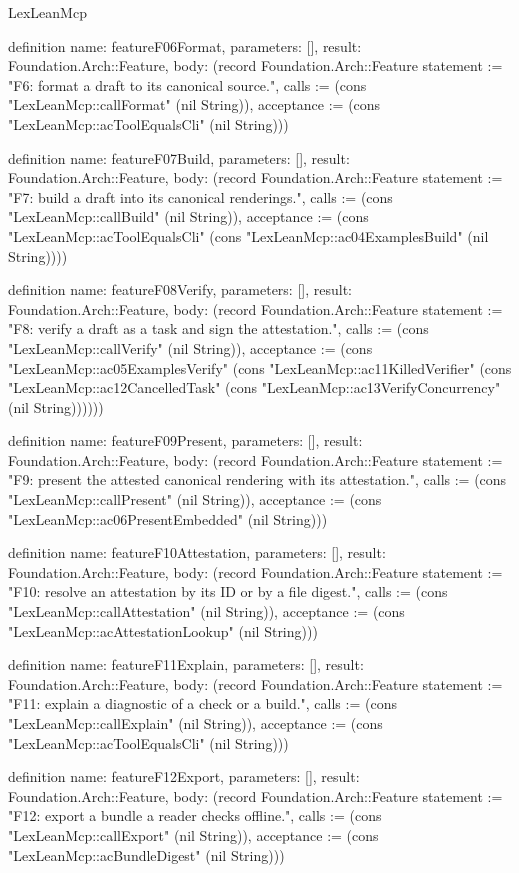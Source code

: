 \begin{lexlean}{LexLeanMcp}
\begin{semanticmodule}
definition{
  name: featureF06Format,
  parameters: [],
  result: Foundation.Arch::Feature,
  body: (record Foundation.Arch::Feature {statement := "F6: format a draft to its canonical source.", calls := (cons "LexLeanMcp::callFormat" (nil String)), acceptance := (cons "LexLeanMcp::acToolEqualsCli" (nil String))})
}

definition{
  name: featureF07Build,
  parameters: [],
  result: Foundation.Arch::Feature,
  body: (record Foundation.Arch::Feature {statement := "F7: build a draft into its canonical renderings.", calls := (cons "LexLeanMcp::callBuild" (nil String)), acceptance := (cons "LexLeanMcp::acToolEqualsCli" (cons "LexLeanMcp::ac04ExamplesBuild" (nil String)))})
}

definition{
  name: featureF08Verify,
  parameters: [],
  result: Foundation.Arch::Feature,
  body: (record Foundation.Arch::Feature {statement := "F8: verify a draft as a task and sign the attestation.", calls := (cons "LexLeanMcp::callVerify" (nil String)), acceptance := (cons "LexLeanMcp::ac05ExamplesVerify" (cons "LexLeanMcp::ac11KilledVerifier" (cons "LexLeanMcp::ac12CancelledTask" (cons "LexLeanMcp::ac13VerifyConcurrency" (nil String)))))})
}

definition{
  name: featureF09Present,
  parameters: [],
  result: Foundation.Arch::Feature,
  body: (record Foundation.Arch::Feature {statement := "F9: present the attested canonical rendering with its attestation.", calls := (cons "LexLeanMcp::callPresent" (nil String)), acceptance := (cons "LexLeanMcp::ac06PresentEmbedded" (nil String))})
}

definition{
  name: featureF10Attestation,
  parameters: [],
  result: Foundation.Arch::Feature,
  body: (record Foundation.Arch::Feature {statement := "F10: resolve an attestation by its ID or by a file digest.", calls := (cons "LexLeanMcp::callAttestation" (nil String)), acceptance := (cons "LexLeanMcp::acAttestationLookup" (nil String))})
}

definition{
  name: featureF11Explain,
  parameters: [],
  result: Foundation.Arch::Feature,
  body: (record Foundation.Arch::Feature {statement := "F11: explain a diagnostic of a check or a build.", calls := (cons "LexLeanMcp::callExplain" (nil String)), acceptance := (cons "LexLeanMcp::acToolEqualsCli" (nil String))})
}

definition{
  name: featureF12Export,
  parameters: [],
  result: Foundation.Arch::Feature,
  body: (record Foundation.Arch::Feature {statement := "F12: export a bundle a reader checks offline.", calls := (cons "LexLeanMcp::callExport" (nil String)), acceptance := (cons "LexLeanMcp::acBundleDigest" (nil String))})
}


\end{semanticmodule}
\end{lexlean}
